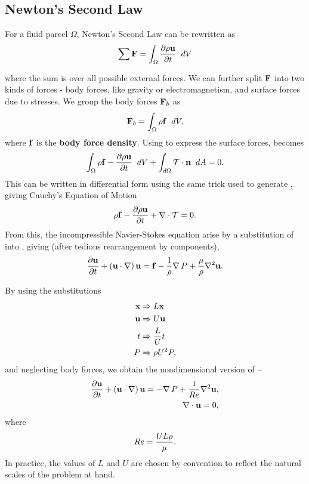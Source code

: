 \subsection{Newton's Second Law}
For a fluid parcel $\Omega$, Newton's Second Law can be rewritten as
\begin{equation}\label{eq:NSLInt}
\sum{}{}{\Vector{F}} = \int{\Omega}{}{
							\pder{1}{\rho\Vector{u}}{t}}{dV}
\end{equation}
where the sum is over all possible external forces. We can further split $\mathbf{F}$ into two kinds of forces - body forces, like gravity or electromagnetism, and surface forces due to stresses. We group the body forces $\mathbf{F}_b$ as \begin{equation}
\Vector{F}_b = \int{\Omega}{}{\rho\Vector{f}}{dV},
\end{equation}
where $\mathbf{f}$ is the {\bf body force density}. Using  to express the surface forces,  becomes
\begin{equation}
\int{\Omega}{}{\rho{\Vector{f}-\pder{1}{\rho\Vector{u}}{t}}}{dV} + \int{d\Omega}{}{\Tensor{T}\cdot\Vector{n}}{dA} = 0.
\end{equation}
This can be written in differential form using the same trick used to generate , giving Cauchy's Equation of Motion
\begin{equation}\label{eq:CauchyEOM}
\rho{\Vector{f}-\pder{1}{\rho\Vector{u}}{t} } + \Div{\Tensor{T}} = 0.
\end{equation}
From this, the incompressible Navier-Stokes equation arise by a substitution of  into , giving (after tedious rearrangement by components),
\begin{equation}\label{eq:NS}
\pder{1}{\Vector{u}}{t} + \paren{\Vector{u}\cdot\nabla}\Vector{u} = \Vector{f} - \frac{1}{\rho}\Grad{P} + \frac{\mu}{\rho}\nabla^2\Vector{u}.
\end{equation}

By using the substitutions
\begin{align}
\mathbf{x} &\Rightarrow L\mathbf{x}\\
\mathbf{u} &\Rightarrow U\mathbf{u}\\
t &\Rightarrow \dfrac{L}{U}t\\
P &\Rightarrow \rho U^2P,
\end{align}
and neglecting body forces, we obtain the nondimensional version of  --
\begin{align}
\pder{1}{\Vector{u}}{t} + \paren{\Vector{u}\cdot\nabla}\Vector{u} = -\Grad{P} + \frac{1}{\ReN}\nabla^2\Vector{u}\label{eq:NSND},\\
\nabla\cdot \Vector{u} = 0,
\end{align}
where \begin{equation}\label{eq:ReN}Re= \dfrac{UL\rho}{\mu}.\end{equation} In practice, the values of $L$ and $U$ are chosen by convention to reflect the natural scales of the problem at hand.
 
